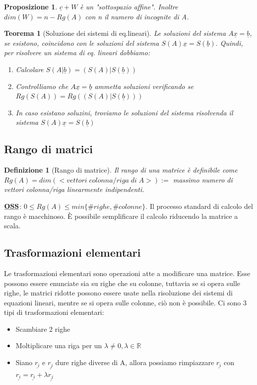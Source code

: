 \documentclass[12pt]{article}
\newenvironment{para}{\begin{adjustwidth}{13mm}{}}{\end{adjustwidth}}
\newtheorem{Definizione}{Definizione}[subsection]
\newtheorem{Teorema}{Teorema}[subsection]
\newtheorem{Proposizione}{Proposizione}[subsection]
\begin{document}
\begin{para}
\begin{Proposizione}
    $\underline{c}+W$ è un "sottospazio affine". \newline Inoltre $dim(W)=n-Rg(A)$ con n il numero di incognite di A.
\end{Proposizione}
\newpage
\begin{Teorema}[Soluzione dei sistemi di eq.lineari]
Le soluzioni del sistema $A\underline{x} = \underline{b}$, se esistono, coincidono con le soluzioni del sistema $S(A)\underline{x} = S(\underline{b}).$ Quindi, per risolvere un sistema di eq. lineari dobbiamo:
\begin{enumerate}
    \item Calcolare $S(A|\underline{b}) = (S(A)|S(\underline{b}))$
    \item Controlliamo che $A\underline{x} = \underline{b}$ ammetta soluzioni verificando se $Rg(S(A)) = Rg((S(A)|S(\underline{b})))$
    \item In caso esistano soluzini, troviamo le soluzioni del sistema risolvenda il sistema $S(A)\underline{x} = S(\underline{b})$
\end{enumerate}
\end{Teorema}


\subsection{Rango di matrici}
\begin{Definizione}[Rango di matrice]
Il rango di una matrice è definibile come \newline $Rg(A) = dim(<vettori \; colonna/riga \; di \; A>) :=$ massimo numero di vettori colonna/riga linearmente indipendenti.
\end{Definizione}
$\bold{\underline{OSS}}$: $0 \leq Rg(A) \leq min\{\#righe, \#colonne\}$. \newline Il processo standard di calcolo del rango è macchinoso. È possibile semplificare il calcolo riducendo la matrice a scala.

\subsection{Trasformazioni elementari}
Le trasformazioni elementari sono operazioni atte a modificare una matrice. Esse possono essere enunciate sia su righe che su colonne, tuttavia se si opera sulle righe, le matrici ridotte possono essere usate nella risoluzione dei sistemi di equazioni lineari, mentre se si opera sulle colonne, ciò non è possibile. Ci sono 3 tipi di trasformazioni elementari:
\begin{itemize}
    \item Scambiare 2 righe
    \item Moltiplicare una riga per un $\lambda \neq 0, \lambda \in \mathbb{R}$
    \item Siano $\underline{r_i}$ e $\underline{r_j}$ dure righe diverse di A, allora possiamo rimpiazzare $\underline{r_i}$ con $\underline{r_i} = \underline{r_i} + \lambda \underline{r_j}$
\end{itemize}


\end{para}
\end{document}
